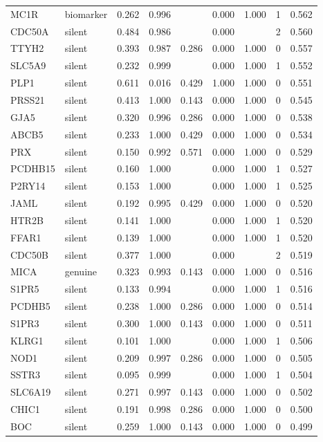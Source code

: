 \begin{longtable}{llrrrrrrr}
MC1R & biomarker & 0.262 & 0.996 &  & 0.000 & 1.000 & 1 & 0.562\\
CDC50A & silent & 0.484 & 0.986 &  & 0.000 &  & 2 & 0.560\\
TTYH2 & silent & 0.393 & 0.987 & 0.286 & 0.000 & 1.000 & 0 & 0.557\\
SLC5A9 & silent & 0.232 & 0.999 &  & 0.000 & 1.000 & 1 & 0.552\\
PLP1 & silent & 0.611 & 0.016 & 0.429 & 1.000 & 1.000 & 0 & 0.551\\
PRSS21 & silent & 0.413 & 1.000 & 0.143 & 0.000 & 1.000 & 0 & 0.545\\
GJA5 & silent & 0.320 & 0.996 & 0.286 & 0.000 & 1.000 & 0 & 0.538\\
ABCB5 & silent & 0.233 & 1.000 & 0.429 & 0.000 & 1.000 & 0 & 0.534\\
PRX & silent & 0.150 & 0.992 & 0.571 & 0.000 & 1.000 & 0 & 0.529\\
PCDHB15 & silent & 0.160 & 1.000 &  & 0.000 & 1.000 & 1 & 0.527\\
P2RY14 & silent & 0.153 & 1.000 &  & 0.000 & 1.000 & 1 & 0.525\\
JAML & silent & 0.192 & 0.995 & 0.429 & 0.000 & 1.000 & 0 & 0.520\\
HTR2B & silent & 0.141 & 1.000 &  & 0.000 & 1.000 & 1 & 0.520\\
FFAR1 & silent & 0.139 & 1.000 &  & 0.000 & 1.000 & 1 & 0.520\\
CDC50B & silent & 0.377 & 1.000 &  & 0.000 &  & 2 & 0.519\\
MICA & genuine & 0.323 & 0.993 & 0.143 & 0.000 & 1.000 & 0 & 0.516\\
S1PR5 & silent & 0.133 & 0.994 &  & 0.000 & 1.000 & 1 & 0.516\\
PCDHB5 & silent & 0.238 & 1.000 & 0.286 & 0.000 & 1.000 & 0 & 0.514\\
S1PR3 & silent & 0.300 & 1.000 & 0.143 & 0.000 & 1.000 & 0 & 0.511\\
KLRG1 & silent & 0.101 & 1.000 &  & 0.000 & 1.000 & 1 & 0.506\\
NOD1 & silent & 0.209 & 0.997 & 0.286 & 0.000 & 1.000 & 0 & 0.505\\
SSTR3 & silent & 0.095 & 0.999 &  & 0.000 & 1.000 & 1 & 0.504\\
SLC6A19 & silent & 0.271 & 0.997 & 0.143 & 0.000 & 1.000 & 0 & 0.502\\
CHIC1 & silent & 0.191 & 0.998 & 0.286 & 0.000 & 1.000 & 0 & 0.500\\
BOC & silent & 0.259 & 1.000 & 0.143 & 0.000 & 1.000 & 0 & 0.499\\

\end{longtable}

